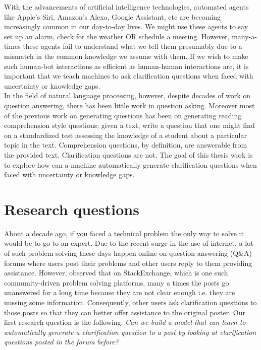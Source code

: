 \documentclass[11pt]{report}
\newcommand\newcite{\citet}	%
\begin{document}
\noindent
With the advancements of artificial intelligence technologies, automated agents like Apple's Siri, Amazon's Alexa, Google Assistant, etc are becoming increasingly common in our day-to-day lives. We might use these agents to say set up an alarm, check for the weather OR schedule a meeting. However, many-a-times these agents fail to understand what we tell them presumably due to a mismatch in the common knowledge we assume with them. If we wish to make such human-bot interactions as efficient as human-human interactions are, it is important that we teach machines to ask clarification questions when faced with uncertainty or knowledge gaps.\\

\noindent
In the field of natural language processing, however, despite decades of work on question answering, there has been little work in question asking. Moreover most of the previous work on generating questions has been on generating reading comprehension style questions: given a text, write a question that one might find on a standardized test assessing the knowledge of a student about a particular topic in the text. Comprehension questions, by definition, are answerable from the provided text. Clarification questions are not. The goal of this thesis work is to explore how can a machine automatically generate clarification questions when faced with uncertainty or knowledge gaps. 

\section{Research questions}

About a decade ago, if you faced a technical problem the only way to solve it would be to go to an expert. Due to the recent surge in the use of internet, a lot of such problem solving these days happen online on question answering (Q\&A) forums where users post their problems and other users reply to them providing assistance. However, \newcite{asaduzzaman2013answering} observed that on StackExchange, which is one such community-driven problem solving platforms, many a times the posts go unanswered for a long time because they are not clear enough i.e. they are missing some information. Consequently, other users ask clarification questions to those posts so that they can better offer assistance to the original poster. Our first research question is the following: \textit{Can we build a model that can learn to automatically generate a clarification question to a post by looking at clarification questions posted in the forum before?}\\
\end{document}
